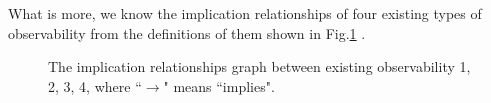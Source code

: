 What is more, we know the implication relationships of four existing types of observability from the definitions of them shown in Fig.\ref{fig:9} \cite{Zhang2016Observability}. 

 \begin{figure}[thpb]
      \centering
      
      \caption{The implication relationships graph between existing observability 1, 2, 3, 4, where ``$\rightarrow$" means ``implies".}
      \label{fig:9}
   \end{figure}

